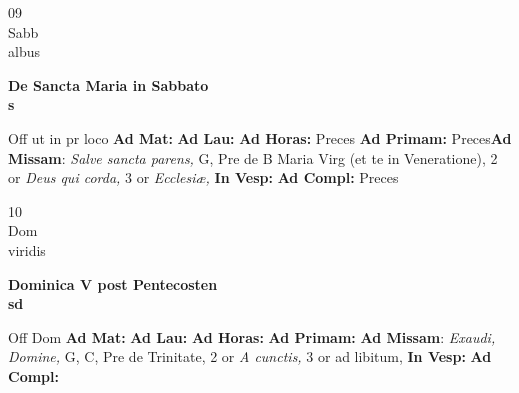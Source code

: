 \documentclass[10pt, openany]{book}
\begin{document}
    \begin{center}
        \begin{minipage}{3.5in}
            \vspace{2em}
            \begin{minipage}{0.5in}
                {\Huge 09} \\
                {\normalsize Sabb} \\
                {\normalsize albus}
            \end{minipage}
            \begin{minipage}{3.0in}
                \textbf{ \large De Sancta Maria in Sabbato \\
                \textnormal{\normalsize s}} \\ 
            \end{minipage}
            \begin{justify}Off ut in pr loco
                \textbf{Ad Mat: }
                \textbf{Ad Lau: }
                \textbf{Ad Horas: }Preces
                \textbf{Ad Primam: }Preces\textbf{Ad Missam}: \textit{Salve sancta parens,} G, Pre de B Maria Virg (et te in Veneratione), 2 or \textit{Deus qui corda,} 3 or \textit{Ecclesiæ,}  
                \textbf{In Vesp: }
                \textbf{Ad Compl: }Preces
            \end{justify}
        \end{minipage}
    \end{center}

    \begin{center}
        \begin{minipage}{3.5in}
            \vspace{2em}
            \begin{minipage}{0.5in}
                {\Huge 10} \\
                {\normalsize Dom} \\
                {\normalsize viridis}
            \end{minipage}
            \begin{minipage}{3.0in}
                \textbf{ \large Dominica V post Pentecosten \\
                \textnormal{\normalsize sd}} \\ 
            \end{minipage}
            \begin{justify}Off Dom
                \textbf{Ad Mat: }
                \textbf{Ad Lau: }
                \textbf{Ad Horas: }
                \textbf{Ad Primam: }\textbf{Ad Missam}: \textit{Exaudi, Domine,} G, C, Pre de Trinitate, 2 or \textit{A cunctis,} 3 or ad libitum,  
                \textbf{In Vesp: }
                \textbf{Ad Compl: }
            \end{justify}
        \end{minipage}
    \end{center}
\end{document}
